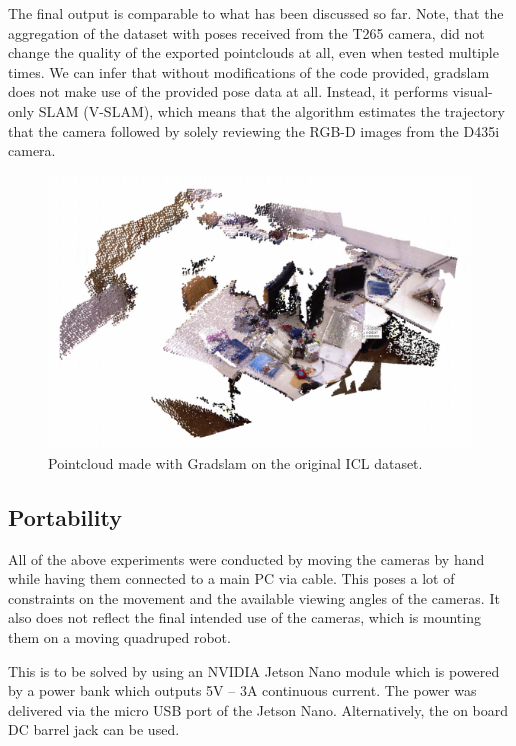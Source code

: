 \documentclass{article}
\begin{document}
The final output is comparable to what has been discussed so far. Note, that the aggregation of the dataset with poses received from the T265 camera, did not change the quality of the exported pointclouds at all, even when tested multiple times. We can infer that without modifications of the code provided, gradslam does not make use of the provided pose data at all. Instead, it performs visual-only SLAM (V-SLAM), which means that the algorithm estimates the trajectory that the camera followed by solely reviewing the RGB-D images from the D435i camera.

\begin{figure}[h] %
    \centering
	\includegraphics[width=\textwidth,height=\textheight,keepaspectratio]{report1-img021.png} %
	\caption{Pointcloud made with Gradslam on the original ICL dataset. }
\end{figure}

\subsection{Portability}

All of the above experiments were conducted by moving the cameras by hand while having them connected to a main PC via cable. This poses a lot of constraints on the movement and the available viewing angles of the cameras. It also does not reflect the final intended use of the cameras, which is mounting them on a moving quadruped robot. 

This is to be solved by using an NVIDIA Jetson Nano module which is powered by a power bank which outputs 5V – 3A continuous current. The power was delivered via the micro USB port of the Jetson Nano. Alternatively, the on board DC barrel jack can be used.
\end{document}
